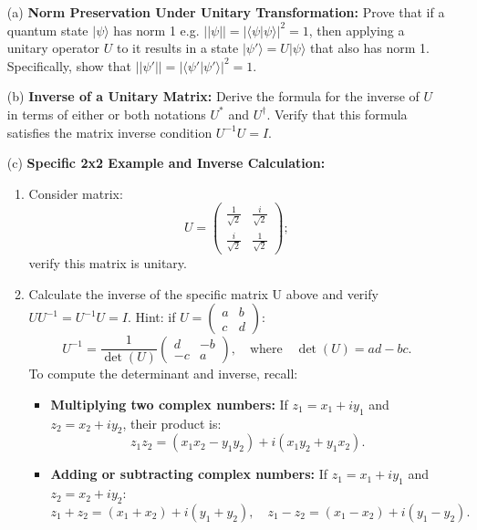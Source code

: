 \documentclass[12pt]{article}
\newcommand{\ket}[1]{| #1 \rangle}
\begin{document}
\begin{enumerate}
    \item[(a)] \textbf{Norm Preservation Under Unitary Transformation:} Prove that if a quantum state \( |\psi\rangle \) has norm 1 e.g. $||\psi|| = | \langle \psi \ket{\psi }|^2=1$, then applying a unitary operator \( U \) to it results in a state \( |\psi'\rangle = U|\psi\rangle \) that also has norm 1. Specifically, show that  \( ||\psi'|| = |\langle \psi' | \psi' \rangle|^2 = 1 \).

    \item[(b)] \textbf{Inverse of a Unitary Matrix:} Derive the formula for the inverse of \( U \) in terms of either or both notations \( U^* \) and \( U^\dagger \). Verify that this formula satisfies the matrix inverse condition \( U^{-1} U = I \).

    \item[(c)] \textbf{Specific 2x2 Example and Inverse Calculation:}
    \begin{enumerate}
        \item Consider matrix:
        \[
      U = \begin{pmatrix}
\frac{1}{\sqrt{2}} & \frac{i}{\sqrt{2}} \\
\frac{i}{\sqrt{2}} & \frac{1}{\sqrt{2}}
\end{pmatrix};
    \]
        verify this matrix is unitary.
        \item Calculate the inverse of the specific  matrix U above and verify $U U^{-1} = U^{-1} U=I$. Hint: if \( U = \begin{pmatrix} a & b \\ c & d \end{pmatrix} \):
        \[
        U^{-1} = \frac{1}{\det(U)} \begin{pmatrix} d & -b \\ -c & a \end{pmatrix}, \quad \text{where} \quad \det(U) = ad - bc.
        \]
        To compute the determinant and inverse, recall:
        \begin{itemize}
            \item \textbf{Multiplying two complex numbers:} If \( z_1 = x_1 + iy_1 \) and \( z_2 = x_2 + iy_2 \), their product is:
            \[
            z_1 z_2 = (x_1x_2 - y_1y_2) + i(x_1y_2 + y_1x_2).
            \]
            \item \textbf{Adding or subtracting complex numbers:} If \( z_1 = x_1 + iy_1 \) and \( z_2 = x_2 + iy_2 \):
            \[
            z_1 + z_2 = (x_1 + x_2) + i(y_1 + y_2), \quad z_1 - z_2 = (x_1 - x_2) + i(y_1 - y_2).
\]
\end{itemize}
\end{enumerate}
\end{enumerate}
\end{document}
